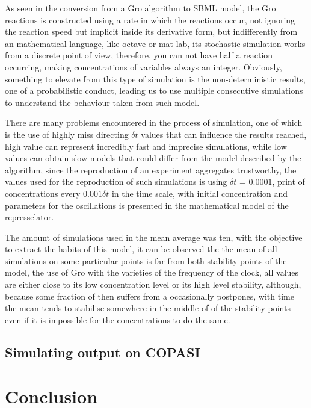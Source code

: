 \documentclass[12pt]{article}
\begin{document}
As seen in the conversion from a Gro algorithm to SBML model, the Gro reactions is constructed using a rate in which the reactions occur, not ignoring the reaction speed but implicit inside its derivative form, but indifferently from an mathematical language, like octave or mat lab, its stochastic simulation works from a discrete point of view, therefore, you can not have half a reaction occurring, making concentrations of variables always an integer. Obviously, something to elevate from this type of simulation is the non-deterministic results, one of a probabilistic conduct, leading us to use multiple consecutive simulations to understand the behaviour taken from such model.

There are many problems encountered in the process of simulation, one of which is the use of highly miss directing $\delta{t}$ values that can influence the results reached, high value can represent incredibly fast and imprecise simulations, while low values can obtain slow models that could differ from the model described by the algorithm, since the reproduction of an experiment aggregates trustworthy, the values used for the reproduction of such simulations is using $\delta{t}$ = $0.0001$, print of concentrations every $0.001\delta{t}$ in the time scale, with initial concentration and parameters for the oscillations is presented in the mathematical model of the represselator.

The amount of simulations used in the mean average was ten, with the objective to extract the habits of this model, it can be observed the the mean of all simulations on some particular points is far from both stability points of the model, the use of Gro with the varieties of the frequency of the clock, all values are either close to its low concentration level or its high level stability, although, because some fraction of then suffers from a occasionally postpones, with time the mean tends to stabilise somewhere in the middle of of the stability points even if it is impossible for the concentrations to do the same.

\subsection{Simulating output on COPASI}
    \lipsum[1]

\section{Conclusion}
    \lipsum[1]
    
\end{document}
